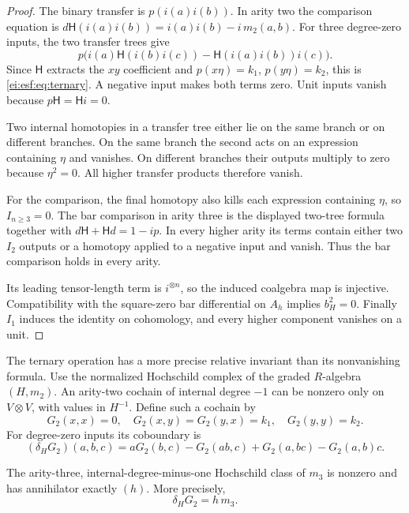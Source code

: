 \begin{proof}
The binary transfer is $p(i(a)i(b))$.
In arity two the comparison equation is
$d\mathsf H(i(a)i(b))=i(a)i(b)-i\,m_2(a,b)$.
For three degree-zero inputs, the two transfer trees give
\[
 p\bigl(i(a)\mathsf H(i(b)i(c))
       -\mathsf H(i(a)i(b))i(c)\bigr).
\]
Since $\mathsf H$ extracts the $xy$ coefficient and
$p(x\eta)=k_1$, $p(y\eta)=k_2$, this is
\eqref{ei:esf:eq:ternary}. A negative input makes both terms
zero. Unit inputs vanish because $p\mathsf H=\mathsf Hi=0$.

Two internal homotopies in a transfer tree either lie on
the same branch or on different branches. On the same
branch the second acts on an expression containing $\eta$
and vanishes. On different branches their outputs
multiply to zero because $\eta^2=0$.
All higher transfer products therefore vanish.

For the comparison, the final homotopy
also kills each expression containing $\eta$, so
$I_{n\ge3}=0$. The bar comparison in arity three is the
displayed two-tree formula together with
$d\mathsf H+\mathsf Hd=1-ip$. In every higher arity its
terms contain either two $I_2$ outputs or a homotopy
applied to a negative input and vanish. Thus the bar
comparison holds in every arity.

Its leading tensor-length
term is $i^{\otimes n}$, so the induced coalgebra map is
injective. Compatibility with the square-zero
bar differential on $A_h$ implies $b_H^2=0$.
Finally $I_1$ induces the identity on cohomology, and
every higher component vanishes on a unit.
\end{proof}

The ternary operation has a more precise relative invariant
than its nonvanishing formula. Use the normalized Hochschild
complex of the graded $R$-algebra $(H,m_2)$. An arity-two
cochain of internal degree $-1$ can be nonzero only on
$V\otimes V$, with values in $H^{-1}$. Define such a cochain by
\begin{equation}\label{ei:esf:eq:primitive}
 G_2(x,x)=0,\quad G_2(x,y)=G_2(y,x)=k_1,\quad G_2(y,y)=k_2.
\end{equation}
For degree-zero inputs its coboundary is
\[
 (\delta_HG_2)(a,b,c)=aG_2(b,c)-G_2(ab,c)
                       +G_2(a,bc)-G_2(a,b)c.
\]

\begin{proposition}\label{ei:esf:prop:torsion-class}
The arity-three, internal-degree-minus-one Hochschild
class of $m_3$ is nonzero and has annihilator exactly $(h)$.
More precisely,
\begin{equation}\label{ei:esf:eq:torsion-class}
 \delta_HG_2=h\,m_3.
\end{equation}
\end{proposition}

